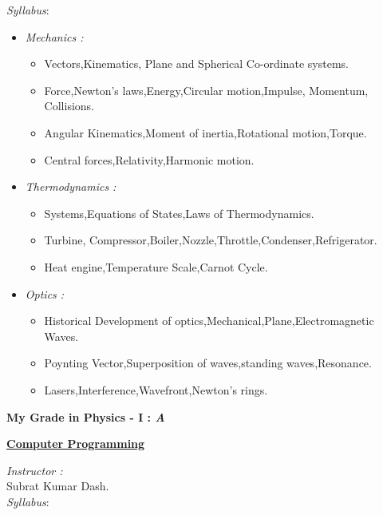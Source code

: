 \documentclass{report}
\begin{document}
\vspace{.1in}
\emph{Syllabus}:\vspace{.05in}
\begin{itemize}
\item \emph{Mechanics :}
\begin{itemize}
\item Vectors,Kinematics, Plane and Spherical Co-ordinate systems.
\item Force,Newton's laws,Energy,Circular motion,Impulse, Momentum, Collisions.
\item Angular Kinematics,Moment of inertia,Rotational motion,Torque.
\item Central forces,Relativity,Harmonic motion.
\end{itemize}
\item \emph{Thermodynamics :}
\begin{itemize}
\item Systems,Equations of States,Laws of Thermodynamics.
\item Turbine, Compressor,Boiler,Nozzle,Throttle,Condenser,Refrigerator.
\item Heat engine,Temperature Scale,Carnot Cycle.
\end{itemize}
\item \emph{Optics :}
\begin{itemize}
\item Historical Development of optics,Mechanical,Plane,Electromagnetic Waves.
\item Poynting Vector,Superposition of waves,standing waves,Resonance.
\item Lasers,Interference,Wavefront,Newton's rings.
\end{itemize}
\end{itemize}
\vspace{.3in}
\Large{\bf My Grade in Physics - I : \emph{A}}
\pagebreak
\begin{center}\huge{\bf \underline{Computer Programming}}\end{center}\vspace{.3in}
\large \emph{Instructor :}\vspace{.1in}\\
\hspace*{.1in} Subrat Kumar Dash.\vspace{.1in}\\
\emph{Syllabus}:\vspace{.05in}
\end{document}
